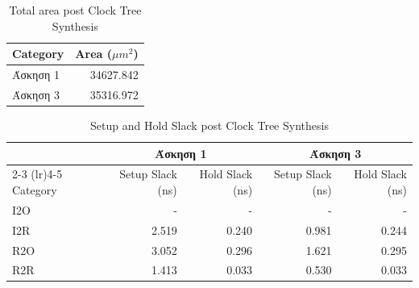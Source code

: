 \begin{table}[H]
    \centering
    \caption{Power Consumption per Category pre Clock Tree Synthesis}
\end{table}

\begin{table}[H]
    \centering
    \caption{Total area post Clock Tree Synthesis}
    \begin{tabular}{lr}
        \toprule
        Category & Area ($\mu m^2$) \\
        \midrule
        Άσκηση 1 & 34627.842 \\
        Άσκηση 3 & 35316.972 \\
        \bottomrule
    \end{tabular}
\end{table}

\begin{table}[H]
    \centering
    \caption{Setup and Hold Slack post Clock Tree Synthesis}
    \begin{tabular}{lrrrr}
        \toprule
         & \multicolumn{2}{c}{\textbf{Άσκηση 1}} & \multicolumn{2}{c}{\textbf{Άσκηση 3}} \\
        \cmidrule(lr){2-3} \cmidrule(lr){4-5}
        Category & Setup Slack (ns) & Hold Slack (ns) & Setup Slack (ns) & Hold Slack (ns) \\
        \midrule
        I2O & - & - & - & - \\
        I2R & 2.519 & 0.240 & 0.981 & 0.244 \\
        R2O & 3.052 & 0.296 & 1.621 & 0.295 \\
        R2R & 1.413 & 0.033 & 0.530 & 0.033 \\
        \bottomrule
    \end{tabular}
\end{table}

